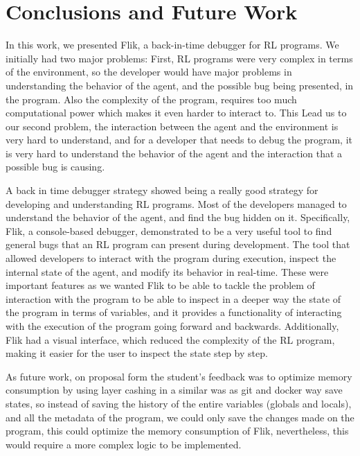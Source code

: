 
\section{Conclusions and Future Work}
\label{sec:conclusion}

In this work, we presented \ac{Flik}, a back-in-time debugger for \ac{RL} programs.
We initially had two major problems: First, \ac{RL} programs were very complex in terms of the environment,
so the developer would have major problems in understanding the behavior of the agent, and
the possible bug being presented, in the program. Also the complexity of the program, requires
too much computational power which makes it even harder to interact to. This Lead us to our second problem,
the interaction between the agent and the environment is very hard to understand, and
for a developer that needs to debug the program, it is very hard to understand the behavior of the agent
and the interaction that a possible bug is causing.

A back in time debugger strategy showed being a really good strategy for developing and 
understanding RL programs. Most of the developers managed to understand the behavior of the agent,
and find the bug hidden on it. Specifically, \ac{Flik}, a console-based debugger, demonstrated to 
be a very useful tool to find general bugs that an \ac{RL} program can present during development. 
The tool that allowed developers to interact with the program during 
execution, inspect the internal state of the agent, and modify its behavior in real-time. These were 
important features as we wanted \ac{Flik} to be able to tackle the problem of interaction with the 
program to be able to inspect in a deeper way the state of the program in terms of variables, and 
it provides a functionality of interacting with the execution of the program going forward and backwards.
Additionally, \ac{Flik} had a visual interface, which reduced the complexity of the \ac{RL} program,
making it easier for the user to inspect the state step by step.


As future work, on proposal form the student's feedback was to optimize memory consumption by 
using layer cashing in a similar was as git and docker way save states, so instead of saving the
history of the entire variables (globals and locals), and all the metadata of the program, we could 
only save the changes made on the program, this could optimize the memory consumption of \ac{Flik},
nevertheless, this would require a more complex logic to be implemented. 

